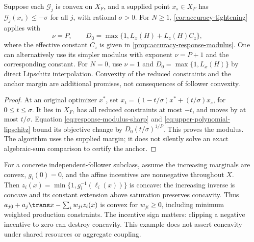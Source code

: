 \begin{corollary}
\label{cor:accuracy-anchor}
Suppose each $\mathcal G_j$ is convex on $X_F$, and a supplied point
$x_s\in X_F$ has $\mathcal G_j(x_s)\le-\sigma$ for all $j$, with
rational $\sigma>0$. For $N\ge1$, \cref{cor:accuracy-tightening} applies with
\[
 \nu=P,\qquad D_0=\max\{1,L_x(H)+L_z(H)C_z\},
\]
where the effective constant $C_z$ is given in
\cref{prop:accuracy-response-modulus}. One can alternatively use its
simpler modulus with exponent $\nu=P+1$ and the corresponding constant.
For $N=0$, use $\nu=1$ and $D_0=\max\{1,L_x(H)\}$ by direct
Lipschitz interpolation. Convexity of the reduced constraints and the anchor margin are additional
promises, not consequences of follower convexity.
\end{corollary}
\begin{proof}
At an original optimizer $x^*$, set
$x_t=(1-t/\sigma)x^*+(t/\sigma)x_s$, for $0\le t\le\sigma$.
It lies in $X_F$, has all reduced constraints at most $-t$, and moves
by at most $t/\sigma$. Equation \eqref{eq:response-modulus-sharp}
and \eqref{eq:upper-polynomial-lipschitz} bound its objective change
by $D_0(t/\sigma)^{1/P}$. This proves the modulus.
The algorithm uses the supplied margin; it does not silently solve an
exact algebraic-sum comparison to certify the anchor.
\end{proof}

For a concrete independent-follower subclass, assume the increasing
marginals are convex, $g_i(0)=0$, and the affine incentives are
nonnegative throughout $X$. Then
$z_i(x)=\min\{1,g_i^{-1}(\ell_i(x))\}$ is concave: the increasing
inverse is concave and its constant extension above saturation preserves
concavity. Thus $a_{j0}+a_j\trans x-\sum_iw_{ji}z_i(x)$ is convex
for $w_{ji}\ge0$, including minimum weighted production constraints.
The incentive sign matters: clipping a negative incentive to zero can
destroy concavity. This example does not assert concavity under shared
resources or aggregate coupling.

